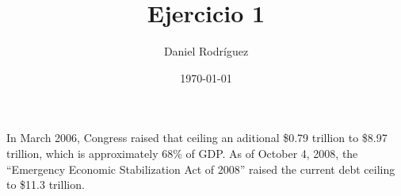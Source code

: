 \documentclass{article}
\title{Ejercicio 1}
\author{Daniel Rodríguez}
\date{\today}
\begin{document}
\maketitle

In March 2006, Congress raised that ceiling an
aditional \$0.79 trillion to \$8.97 trillion,
which is approximately 68\% of GDP. As of October 4,
2008, the ``Emergency Economic Stabilization Act of
2008'' raised the current debt ceiling to \$11.3 trillion.
\end{document}
